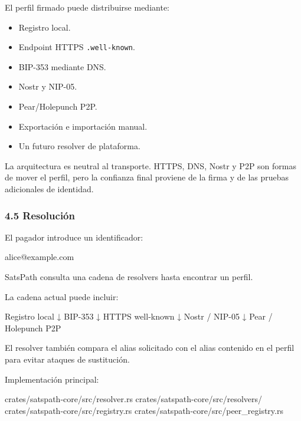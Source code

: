 \documentclass[
]{article}
\newenvironment{Shaded}{}{}
\newcommand{\NormalTok}[1]{#1}
\providecommand{\tightlist}{%
  \setlength{\itemsep}{0pt}\setlength{\parskip}{0pt}}
\begin{document}
El perfil firmado puede distribuirse mediante:

\begin{itemize}
\tightlist
\item
  Registro local.
\item
  Endpoint HTTPS \texttt{.well-known}.
\item
  BIP-353 mediante DNS.
\item
  Nostr y NIP-05.
\item
  Pear/Holepunch P2P.
\item
  Exportación e importación manual.
\item
  Un futuro resolver de plataforma.
\end{itemize}

La arquitectura es neutral al transporte. HTTPS, DNS, Nostr y P2P son
formas de mover el perfil, pero la confianza final proviene de la firma
y de las pruebas adicionales de identidad.

\hypertarget{resoluciuxf3n}{%
\subsubsection{4.5 Resolución}\label{resoluciuxf3n}}

El pagador introduce un identificador:

\begin{Shaded}
\begin{Highlighting}[]
\NormalTok{alice@example.com}
\end{Highlighting}
\end{Shaded}

SatsPath consulta una cadena de resolvers hasta encontrar un perfil.

La cadena actual puede incluir:

\begin{Shaded}
\begin{Highlighting}[]
\NormalTok{Registro local}
\NormalTok{    ↓}
\NormalTok{BIP{-}353}
\NormalTok{    ↓}
\NormalTok{HTTPS well{-}known}
\NormalTok{    ↓}
\NormalTok{Nostr / NIP{-}05}
\NormalTok{    ↓}
\NormalTok{Pear / Holepunch P2P}
\end{Highlighting}
\end{Shaded}

El resolver también compara el alias solicitado con el alias contenido
en el perfil para evitar ataques de sustitución.

Implementación principal:

\begin{Shaded}
\begin{Highlighting}[]
\NormalTok{crates/satspath{-}core/src/resolver.rs}
\NormalTok{crates/satspath{-}core/src/resolvers/}
\NormalTok{crates/satspath{-}core/src/registry.rs}
\NormalTok{crates/satspath{-}core/src/peer\_registry.rs}
\end{Highlighting}
\end{Shaded}
\end{document}
